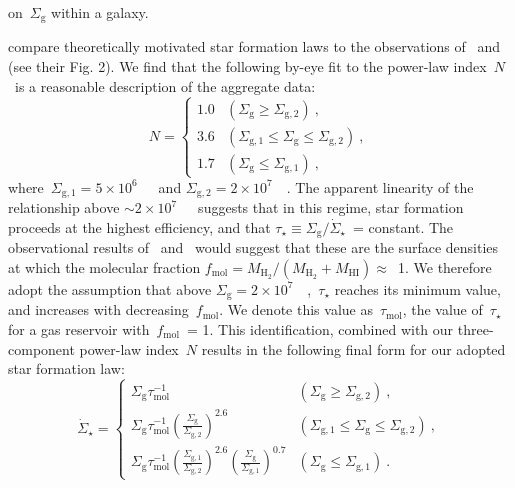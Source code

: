 \documentclass[draft2.tex]{subfiles}
\begin{document}
on~$\Sigma_\text{g}$ within a galaxy. 
\par 
\citet{Krumholz2018a} compare theoretically motivated star formation laws to 
the observations of~\citet{Bigiel2010} and~\citet{Leroy2013} (see their Fig. 2). 
We find that the following by-eye fit to the power-law index~$N$~is a 
reasonable description of the aggregate data: 
\begin{equation} 
N = \begin{cases} 
1.0 & (\Sigma_\text{g} \geq \Sigma_{\text{g},2})~, \\ 
3.6 & (\Sigma_{\text{g},1} \leq \Sigma_\text{g} \leq \Sigma_{\text{g},2})~, \\ 
1.7 & (\Sigma_\text{g} \leq \Sigma_{\text{g},1})~, 
\end{cases} 
\label{eq:sf_law_indeces} 
\end{equation} 
where~$\Sigma_{\text{g},1} = 5\times10^6$~\msun~\persqkpc~and 
$\Sigma_{\text{g},2} = 2\times10^7$~\msun~\persqkpc. 
The apparent linearity of the relationship above 
$\sim2\times10^7$~\msun~\persqkpc~suggests that in this regime, star formation 
proceeds at the highest efficiency, and that 
$\tau_\star \equiv \Sigma_\text{g}/\dot{\Sigma}_\star$~= constant. 
The observational results of~\citet{Leroy2013} and~\citet{Kennicutt2021} would 
suggest that these are the surface densities at which the molecular fraction 
$f_\text{mol} = M_{\text{H}_2} / (M_{\text{H}_2} + M_\text{HI}) \approx$~1. 
We therefore adopt the assumption that above 
$\Sigma_\text{g} = 2\times10^7$~\msun~\persqkpc,~$\tau_\star$ reaches its 
minimum value, and increases with decreasing~$f_\text{mol}$. 
We denote this value as~$\tau_\text{mol}$, the value of~$\tau_\star$ for a gas 
reservoir with~$f_\text{mol}$~= 1. 
This identification, combined with our three-component power-law index~$N$ 
results in the following final form for our adopted star formation law: 
\begin{equation} 
\dot{\Sigma}_\star = \begin{cases} 
\Sigma_\text{g} \tau_\text{mol}^{-1} & 
(\Sigma_\text{g} \geq \Sigma_{\text{g},2})~, 
\\ 
\Sigma_\text{g} \tau_\text{mol}^{-1} \left(\frac{
	\Sigma_\text{g}
}{
	\Sigma_{\text{g},2} 
}\right)^{2.6} & 
(\Sigma_{\text{g},1} \leq \Sigma_\text{g} \leq \Sigma_{\text{g},2})~, 
\\ 
\Sigma_\text{g} \tau_\text{mol}^{-1} \left(\frac{
	\Sigma_{\text{g},1} 
}{
	\Sigma_{\text{g},2} 
}\right)^{2.6}\left(\frac{
	\Sigma_\text{g}
}{
	\Sigma_{\text{g},1} 
}\right)^{0.7} & 
(\Sigma_\text{g} \leq \Sigma_{\text{g},1})~. 
\end{cases} 
\label{eq:sf_law} 
\end{equation} 
\end{document}
